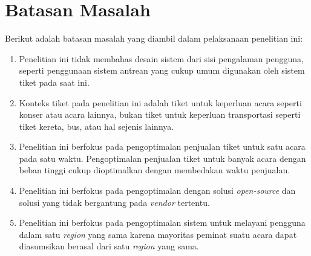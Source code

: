 \section{Batasan Masalah}
\label{sec:batasan-masalah}

Berikut adalah batasan masalah yang diambil dalam pelaksanaan penelitian ini:

\begin{enumerate}
  \item Penelitian ini tidak membahas desain sistem dari sisi pengalaman pengguna, seperti penggunaan sistem antrean yang cukup umum digunakan oleh sistem tiket pada saat ini.
  \item Konteks tiket pada penelitian ini adalah tiket untuk keperluan acara seperti konser atau acara lainnya, bukan tiket untuk keperluan transportasi seperti tiket kereta, bus, atau hal sejenis lainnya.
  \item Penelitian ini berfokus pada pengoptimalan penjualan tiket untuk satu acara pada satu waktu. Pengoptimalan penjualan tiket untuk banyak acara dengan beban tinggi cukup dioptimalkan dengan membedakan waktu penjualan.
  \item Penelitian ini berfokus pada pengoptimalan dengan solusi \textit{open-source} dan solusi yang tidak bergantung pada \textit{vendor} tertentu.
  \item Penelitian ini berfokus pada pengoptimalan sistem untuk melayani pengguna dalam satu \textit{region} yang sama karena mayoritas peminat suatu acara dapat diasumsikan berasal dari satu \textit{region} yang sama.
\end{enumerate}

